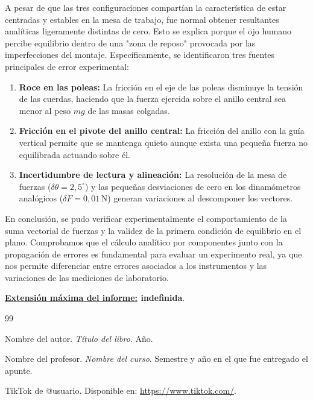 \documentclass[12pt,a4paper]{article}
\begin{document}
A pesar de que las tres configuraciones compartían la característica de estar centradas y estables en la mesa de trabajo, fue normal obtener resultantes analíticas ligeramente distintas de cero. Esto se explica porque el ojo humano percibe equilibrio dentro de una "zona de reposo" provocada por las imperfecciones del montaje. Específicamente, se identificaron tres fuentes principales de error experimental:
\begin{enumerate}[leftmargin=*]
\item \textbf{Roce en las poleas:} La fricción en el eje de las poleas disminuye la tensión de las cuerdas, haciendo que la fuerza ejercida sobre el anillo central sea menor al peso $mg$ de las masas colgadas.
\item \textbf{Fricción en el pivote del anillo central:} La fricción del anillo con la guía vertical permite que se mantenga quieto aunque exista una pequeña fuerza no equilibrada actuando sobre él.
\item \textbf{Incertidumbre de lectura y alineación:} La resolución de la mesa de fuerzas ($\delta\theta = 2{,}5^\circ$) y las pequeñas desviaciones de cero en los dinamómetros analógicos ($\delta F = 0{,}01\,\mathrm{N}$) generan variaciones al descomponer los vectores.
\end{enumerate}

En conclusión, se pudo verificar experimentalmente el comportamiento de la suma vectorial de fuerzas y la validez de la primera condición de equilibrio en el plano. Comprobamos que el cálculo analítico por componentes junto con la propagación de errores es fundamental para evaluar un experimento real, ya que nos permite diferenciar entre errores asociados a los instrumentos y las variaciones de las mediciones de laboratorio.

\textbf{\underline{Extensión máxima del informe:} indefinida}.

\begin{thebibliography}{99}

 Nombre del autor. \textit{Título del libro}. Año.

 Nombre del profesor. \textit{Nombre del curso}. Semestre y año en el que fue entregado el apunte.

 TikTok de @usuario. Disponible en: \url{https://www.tiktok.com/}.

\end{thebibliography}
\end{document}
